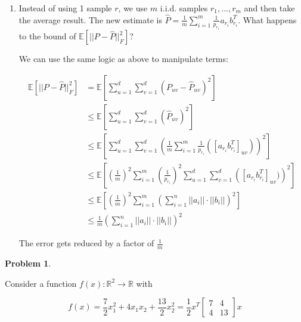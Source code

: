 \documentclass[11pt]{article}
\newcommand{\R}{\mathbb{R}}
\theoremstyle{definition}
\theoremstyle{case}
\theoremstyle{theorem}
\newtheorem{prob}{Problem}
\begin{document}
\begin{enumerate}[label=(\alph*)]
\newpage

\item Instead of using 1 sample $r$, we use $m$ i.i.d. samples $r_1, ..., r_m$ and then take the average result. 
The new estimate is $\hat{P} = \frac{1}{m} \sum_{i=1}^m \frac{1}{p_{r_i}} a_{r_i} b_{r_i}^T$. What happens to the bound
of $\mathbb{E}\left[ ||P - \hat{P}||_F^2 \right]$?

We can use the same logic as above to manipulate terms:

\begin{align*}
  \mathbb{E}\left[ ||P - \hat{P}||_F^2 \right] &= \mathbb{E}\left[ \sum_{u=1}^{d} \sum_{v=1}^{d} (P_{uv} - \hat{P}_{uv})^2 \right] \\
                                               &\leq \mathbb{E}\left[ \sum_{u=1}^{d} \sum_{v=1}^{d} (\hat{P}_{uv})^2 \right] \\
                                               &\leq \mathbb{E}\left[ \sum_{u=1}^{d} \sum_{v=1}^{d} \left( \frac{1}{m} \sum_{i=1}^m \frac{1}{p_{r_i}} ([a_{r_i} b_{r_i}^T]_{uv}) \right)^2 \right] \\
                                               &\leq \mathbb{E}\left[ (\frac{1}{m})^2 \sum_{i=1}^m (\frac{1}{p_{r_i}})^2 \sum_{u=1}^{d} \sum_{v=1}^{d} \left( [a_{r_i} b_{r_i}^T]_{uv}) \right)^2 \right] \\
                                               &\leq \mathbb{E}\left[ (\frac{1}{m})^2 \sum_{i=1}^m \left( \sum_{i=1}^n ||a_i|| \cdot ||b_i|| \right)^2 \right] \\
                                               &\leq \frac{1}{m} \left( \sum_{i=1}^n ||a_i|| \cdot ||b_i|| \right)^2 
\end{align*}

The error gets reduced by a factor of $\frac{1}{m}$

\end{enumerate}

\newpage

\begin{prob}
\end{prob}

Consider a function $f(x) : \R^2 \rightarrow \R$ with

\[
  f(x) = \frac{7}{2} x_1^2 + 4 x_1 x_2 + \frac{13}{2} x_2^2 = \frac{1}{2} x^T \left[ \begin{matrix} 7 & 4 \\ 4 & 13 \end{matrix}\right] x
\]
\end{document}
